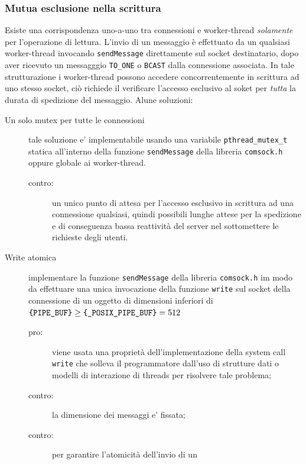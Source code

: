 \documentclass[a4paper,10pt]{article}
\begin{document}
\subsubsection{Mutua esclusione nella scrittura}
Esiste una corrispondenza uno-a-uno tra connessioni e worker-thread
\emph{solamente} per l'operazione di lettura. L'invio di un messaggio
\`e effettuato da un qualsiasi worker-thread invocando
\texttt{sendMessage} direttamente sul socket destinatario, dopo aver
ricevuto un messagggio \verb+TO_ONE+ o \verb+BCAST+ dalla connessione
associata. In tale strutturazione i worker-thread possono accedere
concorrentemente in scrittura ad uno stesso socket, ci\`o richiede il
verificare l'accesso esclusivo al soket per \emph{tutta} la durata di
spedizione del messaggio. Alune soluzioni:
\begin{description}
  \item[Un solo mutex per tutte le connessioni] tale soluzione e'
    implementabile usando una variabile \verb+pthread_mutex_t+ statica
    all'interno della funzione \texttt{sendMessage} della libreria
    \texttt{comsock.h} oppure globale ai worker-thread.
    \begin{description}
       \item[contro:] un unico punto di attesa per l'accesso esclusivo
         in scrittura ad una connessione qualsiasi, quindi possibili
         lunghe attese per la spedizione e di conseguenza bassa
         reattivit\`a del server nel sottomettere le richieste degli
         utenti.
    \end{description}
  \item[Write atomica] implementare la funzione \texttt{sendMessage}
  della libreria \texttt{comsock\-.h} im modo da effettuare una unica
  invocazione della funzione \texttt{write} sul socket della
  connessione di un oggetto di dimensioni inferiori di \\
  \begin{math}
    \verb+{PIPE_BUF}+ \geq \verb+{_POSIX_PIPE_BUF}+ = 512
  \end{math}
  \begin{description}
    \item[pro:] viene usata una propriet\`a
      dell'implementazione della system call \texttt{write} che
      solleva il programmatore dall'uso di strutture dati o modelli di
      interazione di threads per risolvere tale problema;
    \item[contro:] la dimensione dei messaggi e' fissata;
    \item[contro:] per garantire l'atomicit\`a dell'invio di un

\end{description}
\end{description}
\end{document}
